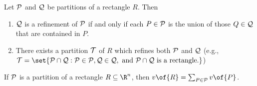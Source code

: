 \begin{lemma}
    Let $\cal{P}$ and $\cal{Q}$ be partitions of a rectangle $R$. Then 
    \begin{enumerate}
        \item $\cal{Q}$ is a refinement of $\cal{P}$ if and only if each $P \in \cal{P}$ is the union of those $Q \in \cal{Q}$ that are contained in $P$.
        \item There exists a partition $\cal{T}$ of $R$ which refines both $\cal{P}$ and $\cal{Q}$ (e.g., $\cal{T} = \set{P \cap Q: P \in \cal{P}, Q \in \cal{Q}, \text{ and } P \cap Q \text{ is a rectangle.}}$)
    \end{enumerate}
\end{lemma}

\begin{lemma}
    If $\cal{P}$ is a partition of a rectangle $R \subseteq \R^n$, then $v\of{R} = \sum_{P \in \cal{P}} v\of{P}$.
\end{lemma}